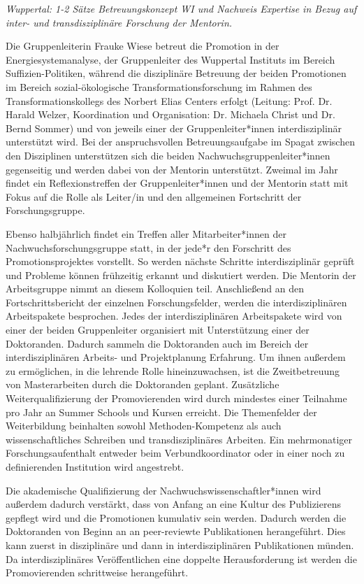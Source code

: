 \documentclass[a4paper,11pt,twoside]{scrartcl}
\begin{document}
\textit{Wuppertal: 1-2 Sätze Betreuungskonzept WI und Nachweis Expertise in Bezug auf inter- und transdisziplinäre Forschung der Mentorin.}

Die Gruppenleiterin Frauke Wiese betreut die Promotion in der Energiesystemanalyse, der Gruppenleiter des Wuppertal Instituts im Bereich Suffizien-Politiken, während die disziplinäre Betreuung der beiden Promotionen im Bereich sozial-ökologische Transformationsforschung im Rahmen des Transformationskollegs des Norbert Elias Centers erfolgt (Leitung: Prof. Dr. Harald Welzer, Koordination und Organisation: Dr. Michaela Christ und Dr. Bernd Sommer) und von jeweils einer der Gruppenleiter*innen interdisziplinär unterstützt wird. Bei der anspruchsvollen Betreuungsaufgabe im Spagat zwischen den Disziplinen unterstützen sich die beiden Nachwuchsgruppenleiter*innen gegenseitig und werden dabei von der Mentorin unterstützt. Zweimal im Jahr findet ein Reflexionstreffen der Gruppenleiter*innen und der Mentorin statt mit Fokus auf die Rolle als Leiter/in und den allgemeinen Fortschritt der Forschungsgruppe. 

Ebenso halbjährlich findet ein Treffen aller Mitarbeiter*innen der Nachwuchsforschungsgruppe statt, in der jede*r den Forschritt des Promotionsprojektes vorstellt. So werden nächste Schritte interdisziplinär geprüft und Probleme können frühzeitig erkannt und diskutiert werden. Die Mentorin der Arbeitsgruppe nimmt an diesem Kolloquien teil. Anschließend an den Fortschrittsbericht der einzelnen Forschungsfelder, werden die interdisziplinären Arbeitspakete besprochen. Jedes der interdisziplinären Arbeitspakete wird von einer der beiden Gruppenleiter organisiert mit Unterstützung einer der Doktoranden. Dadurch sammeln die Doktoranden auch im Bereich der interdisziplinären Arbeits- und Projektplanung Erfahrung. Um ihnen außerdem zu ermöglichen, in die lehrende Rolle hineinzuwachsen, ist die Zweitbetreuung von Masterarbeiten durch die Doktoranden geplant. Zusätzliche Weiterqualifizierung der Promovierenden wird durch mindestes einer Teilnahme pro Jahr an Summer Schools und Kursen erreicht. Die Themenfelder der Weiterbildung beinhalten sowohl Methoden-Kompetenz als auch wissenschaftliches Schreiben und transdisziplinäres Arbeiten. Ein mehrmonatiger Forschungsaufenthalt entweder beim Verbundkoordinator oder in einer noch zu definierenden Institution wird angestrebt.


Die akademische Qualifizierung der Nachwuchswissenschaftler*innen wird außerdem dadurch verstärkt, dass von Anfang an eine Kultur des Publizierens gepflegt wird und die Promotionen kumulativ sein werden. Dadurch werden die Doktoranden von Beginn an an peer-reviewte Publikationen herangeführt. Dies kann zuerst in disziplinäre und dann in interdisziplinären Publikationen münden. Da interdisziplinäres Veröffentlichen eine doppelte Herausforderung ist werden die Promovierenden schrittweise herangeführt.
\end{document}
